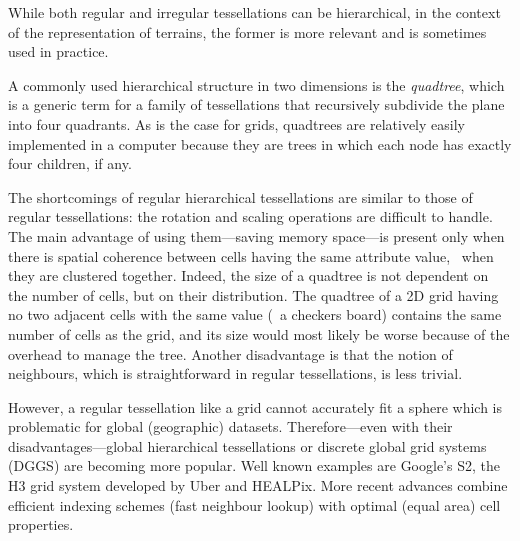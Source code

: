 While both regular and irregular tessellations can be hierarchical, in the context of the representation of terrains, the former is more relevant and is sometimes used in practice.


%

A commonly used hierarchical structure in two dimensions is the \emph{quadtree}, which is a generic term for a family of tessellations that recursively subdivide the plane into four quadrants.%
As is the case for grids, quadtrees are relatively easily implemented in a computer because they are trees in which each node has exactly four children, if any.

%

The shortcomings of regular hierarchical tessellations are similar to those of regular tessellations: the rotation and scaling operations are difficult to handle.
The main advantage of using them---saving memory space---is present only when there is spatial coherence between cells having the same attribute value, \ie\ when they are clustered together.
Indeed, the size of a quadtree is not dependent on the number of cells, but on their distribution.
The quadtree of a 2D grid having no two adjacent cells with the same value (\eg\ a checkers board) contains the same number of cells as the grid, and its size would most likely be worse because of the overhead to manage the tree.
Another disadvantage is that the notion of neighbours, which is straightforward in regular tessellations, is less trivial.

%
However, a regular tessellation like a grid cannot accurately fit a sphere which is problematic for global (geographic) datasets.
Therefore---even with their disadvantages---global hierarchical tessellations or discrete global grid systems (DGGS) are becoming more popular.
Well known examples are Google's S2, the H3 grid system developed by Uber and HEALPix.
More recent advances combine efficient indexing schemes (fast neighbour lookup) with optimal (equal area) cell properties.

